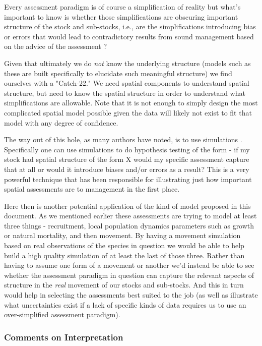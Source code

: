\documentclass[11pt]{article}
\begin{document}
Every assessment paradigm is of course a simplification of reality but what's important to know is whether those simplifications are obscuring important structure of the stock and sub-stocks, i.e., are the simplifications introducing bias or errors that would lead to contradictory results from sound management based on the advice of the assessment \citep{cadrin2020}? 

Given that ultimately we do \textit{not} know the underlying structure (models such as these are built specifically to elucidate such meaningful structure) we find ourselves with a "Catch-22." We need spatial components to understand spatial structure, but need to know the spatial structure in order to understand what simplifications are allowable. Note that it is not enough to simply design the most complicated spatial model possible given the data will likely not exist to fit that model with any degree of confidence. 

The way out of this hole, as many authors have noted, is to use simulations \citep{cadrin2020} \citep{goethel2023}. Specifically one can use simulations to do hypothesis testing of the form - if my stock had spatial structure of the form X would my specific assessment capture that at all or would it introduce biases and/or errors as a result? This is a very powerful technique that has been responsible for illustrating just how important spatial assessments are to management in the first place.\newline

Here then is another potential application of the kind of model proposed in this document. As we mentioned earlier these assessments are trying to model at least three things - recruitment, local population dynamics parameters such as growth or natural mortality, and then movement. By having a movement simulation based on real observations of the species in question we would be able to help build a high quality simulation of at least the last of those three. Rather than having to assume one form of a movement or another we'd instead be able to see whether the assessment paradigm in question can capture the relevant aspects of structure in the \textit{real} movement of our stocks and sub-stocks. And this in turn would help in selecting the assessments best suited to the job (as well as illustrate what uncertainties exist if a lack of specific kinds of data requires us to use an over-simplified assessment paradigm). 

\subsubsection{Comments on Interpretation}
\end{document}
